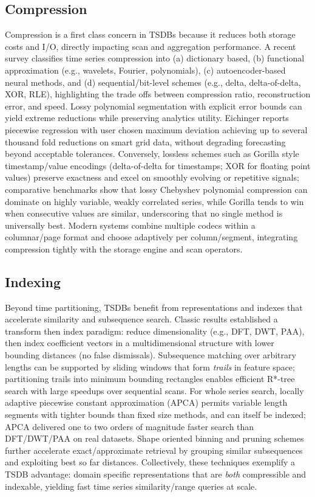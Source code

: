 \subsection{Compression} Compression is a first class concern in TSDBs because
it reduces both storage costs and I/O, directly impacting scan and aggregation
performance. A recent survey classifies time series compression into (a)
dictionary based, (b) functional approximation (e.g., wavelets, Fourier,
polynomials), (c) autoencoder-based neural methods, and (d)
sequential/bit-level schemes (e.g., delta, delta-of-delta, XOR, RLE),
highlighting the trade offs between compression ratio, reconstruction error,
and speed\cite{Chiarot2023}. Lossy polynomial segmentation with explicit error
bounds can yield extreme reductions while preserving analytics utility.
Eichinger\cite{Eichinger2015} reports piecewise regression with user chosen
maximum deviation achieving up to several thousand fold reductions on smart
grid data, without degrading forecasting beyond acceptable
tolerances\cite{Eichinger2015}. Conversely, lossless schemes such as
Gorilla style timestamp/value encodings (delta-of-delta for timestamps; XOR for
floating point values) preserve exactness and excel on smoothly evolving or
repetitive signals; comparative benchmarks show that lossy Chebyshev polynomial
compression can dominate on highly variable, weakly correlated series, while
Gorilla tends to win when consecutive values are similar, underscoring that no
single method is universally best\cite{Iqbal2021}. Modern systems combine
multiple codecs within a columnar/page format and choose adaptively per
column/segment, integrating compression tightly with the storage engine and
scan operators\cite{Jensen2022}.

\subsection{Indexing} Beyond time partitioning, TSDBs benefit from
representations and indexes that accelerate similarity and subsequence search.
Classic results established a transform then index paradigm: reduce
dimensionality (e.g., DFT, DWT, PAA), then index coefficient vectors in a
multidimensional structure with lower bounding distances (no false
dismissals)\cite{Faloutsos1994}. Subsequence matching over arbitrary lengths
can be supported by sliding windows that form \emph{trails} in feature space;
partitioning trails into minimum bounding rectangles enables efficient R*-tree
search with large speedups over sequential scans\cite{Faloutsos1994}. For
whole series search, locally adaptive piecewise constant approximation (APCA)
permits variable length segments with tighter bounds than fixed size methods,
and can itself be indexed; APCA delivered one to two orders of magnitude faster
search than DFT/DWT/PAA on real datasets\cite{Keogh2001}. Shape oriented
binning and pruning schemes further accelerate exact/approximate retrieval by
grouping similar subsequences and exploiting best so far
distances\cite{Keogh1999}. Collectively, these techniques exemplify a TSDB
advantage: domain specific representations that are \emph{both} compressible
and indexable, yielding fast time series similarity/range queries at scale.

